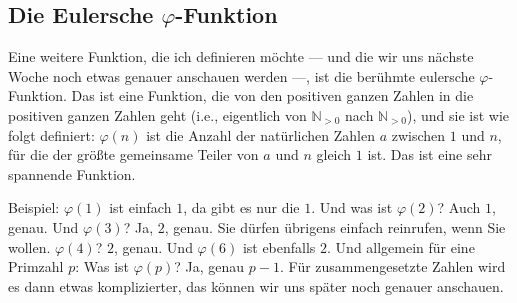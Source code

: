 \subsection{Die Eulersche \texorpdfstring{$\varphi$}{phi}-Funktion}

\begin{spoken-clean}[01:13:42 - 01:16:40]
Eine weitere Funktion, die ich definieren möchte --- und die wir uns nächste Woche noch etwas genauer anschauen werden ---, ist die berühmte eulersche $\varphi$-Funktion. Das ist eine Funktion, die von den positiven ganzen Zahlen in die positiven ganzen Zahlen geht (i.e., eigentlich von $\mathbb{N}_{>0}$ nach $\mathbb{N}_{>0}$), und sie ist wie folgt definiert: $\varphi(n)$ ist die Anzahl der natürlichen Zahlen $a$ zwischen $1$ und $n$, für die der größte gemeinsame Teiler von $a$ und $n$ gleich $1$ ist. Das ist eine sehr spannende Funktion.

Beispiel: $\varphi(1)$ ist einfach $1$, da gibt es nur die $1$. Und was ist $\varphi(2)$? Auch $1$, genau. Und $\varphi(3)$? Ja, $2$, genau. Sie dürfen übrigens einfach reinrufen, wenn Sie wollen. $\varphi(4)$? $2$, genau. Und $\varphi(6)$ ist ebenfalls $2$. Und allgemein für eine Primzahl $p$: Was ist $\varphi(p)$? Ja, genau $p - 1$. Für zusammengesetzte Zahlen wird es dann etwas komplizierter, das können wir uns später noch genauer anschauen.
\end{spoken-clean}

\begin{math-stroke}

\end{math-stroke}

